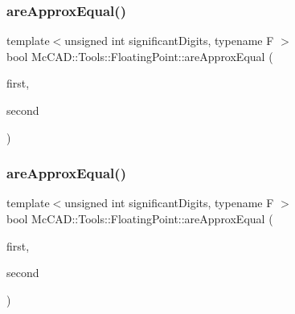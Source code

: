 \subsubsection{\texorpdfstring{are\+Approx\+Equal()}{areApproxEqual()}\hspace{0.1cm}{\footnotesize\ttfamily [1/4]}}
{\footnotesize\ttfamily template$<$unsigned int significant\+Digits, typename F $>$ \\
bool Mc\+C\+A\+D\+::\+Tools\+::\+Floating\+Point\+::are\+Approx\+Equal (\begin{DoxyParamCaption}\item[{const \hyperlink{classMcCAD_1_1Tools_1_1FloatingPoint_1_1BinaryDecomposition}{Binary\+Decomposition}$<$ F $>$ \&}]{first,  }\item[{const \hyperlink{classMcCAD_1_1Tools_1_1FloatingPoint_1_1BinaryDecomposition}{Binary\+Decomposition}$<$ F $>$ \&}]{second }\end{DoxyParamCaption})}

\mbox{\label{namespaceMcCAD_1_1Tools_1_1FloatingPoint_ad7e54b038b918c47fc8838d8dd57470a}} 
\subsubsection{\texorpdfstring{are\+Approx\+Equal()}{areApproxEqual()}\hspace{0.1cm}{\footnotesize\ttfamily [2/4]}}
{\footnotesize\ttfamily template$<$unsigned int significant\+Digits, typename F $>$ \\
bool Mc\+C\+A\+D\+::\+Tools\+::\+Floating\+Point\+::are\+Approx\+Equal (\begin{DoxyParamCaption}\item[{const \hyperlink{classMcCAD_1_1Tools_1_1FloatingPoint_1_1DecimalDecomposition}{Decimal\+Decomposition}$<$ F $>$ \&}]{first,  }\item[{const \hyperlink{classMcCAD_1_1Tools_1_1FloatingPoint_1_1DecimalDecomposition}{Decimal\+Decomposition}$<$ F $>$ \&}]{second }\end{DoxyParamCaption})}

\mbox{\label{namespaceMcCAD_1_1Tools_1_1FloatingPoint_a2ceca8cd024594bb41c711017c06c433}} 

